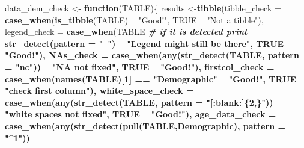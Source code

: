 \documentclass[
]{article}
\newenvironment{Shaded}{\begin{snugshade}}{\end{snugshade}}
\newcommand{\CommentTok}[1]{\textcolor[rgb]{0.56,0.35,0.01}{\textit{#1}}}
\newcommand{\ControlFlowTok}[1]{\textcolor[rgb]{0.13,0.29,0.53}{\textbf{#1}}}
\newcommand{\DataTypeTok}[1]{\textcolor[rgb]{0.13,0.29,0.53}{#1}}
\newcommand{\DecValTok}[1]{\textcolor[rgb]{0.00,0.00,0.81}{#1}}
\newcommand{\KeywordTok}[1]{\textcolor[rgb]{0.13,0.29,0.53}{\textbf{#1}}}
\newcommand{\NormalTok}[1]{#1}
\newcommand{\OperatorTok}[1]{\textcolor[rgb]{0.81,0.36,0.00}{\textbf{#1}}}
\newcommand{\OtherTok}[1]{\textcolor[rgb]{0.56,0.35,0.01}{#1}}
\newcommand{\StringTok}[1]{\textcolor[rgb]{0.31,0.60,0.02}{#1}}
\begin{document}
\begin{Shaded}
\begin{Highlighting}[]
\NormalTok{data_dem_check <-}\StringTok{ }\ControlFlowTok{function}\NormalTok{(TABLE)\{}
\NormalTok{results <-}\KeywordTok{tibble}\NormalTok{(}\DataTypeTok{tibble_check =} \KeywordTok{case_when}\NormalTok{(}\KeywordTok{is_tibble}\NormalTok{(TABLE) }\OperatorTok{~}\StringTok{ "Good!"}\NormalTok{,}
                                                 \OtherTok{TRUE} \OperatorTok{~}\StringTok{ "Not a tibble"}\NormalTok{),}
       \DataTypeTok{legend_check =} \KeywordTok{case_when}\NormalTok{(TABLE }\OperatorTok{%>%}\StringTok{ }\KeywordTok{slice}\NormalTok{(}\KeywordTok{n}\NormalTok{()) }\OperatorTok{%>%}\KeywordTok{pull}\NormalTok{(}\StringTok{`}\DataTypeTok{2018}\StringTok{`}\NormalTok{) }\OperatorTok{%>%}
\StringTok{   }\CommentTok{# if it is detected print }
\StringTok{                          }\KeywordTok{str_detect}\NormalTok{(}\DataTypeTok{pattern =} \StringTok{"--"}\NormalTok{)  }\OperatorTok{~}\StringTok{ "Legend might still be there"}\NormalTok{,}
                                                 \OtherTok{TRUE} \OperatorTok{~}\StringTok{ "Good!"}\NormalTok{),}
       \DataTypeTok{NAs_check =} \KeywordTok{case_when}\NormalTok{(}\KeywordTok{any}\NormalTok{(}\KeywordTok{str_detect}\NormalTok{(TABLE, }\DataTypeTok{pattern =} \StringTok{"nc"}\NormalTok{)) }
                                                      \OperatorTok{~}\StringTok{ "NA not fixed"}\NormalTok{,}
                                                 \OtherTok{TRUE} \OperatorTok{~}\StringTok{ "Good!"}\NormalTok{),}
  \DataTypeTok{firstcol_check =} \KeywordTok{case_when}\NormalTok{(}\KeywordTok{names}\NormalTok{(TABLE)[}\DecValTok{1}\NormalTok{] }\OperatorTok{==}\StringTok{ "Demographic"} 
                                                      \OperatorTok{~}\StringTok{ "Good!"}\NormalTok{,}
                                                 \OtherTok{TRUE} \OperatorTok{~}\StringTok{ "check first column"}\NormalTok{),}
  \DataTypeTok{white_space_check =} \KeywordTok{case_when}\NormalTok{(}\KeywordTok{any}\NormalTok{(}\KeywordTok{str_detect}\NormalTok{(TABLE, }\DataTypeTok{pattern =} \StringTok{"[:blank:]\{2,\}"}\NormalTok{)) }
                                                      \OperatorTok{~}\StringTok{ "white spaces not fixed"}\NormalTok{,}
                                                 \OtherTok{TRUE} \OperatorTok{~}\StringTok{ "Good!"}\NormalTok{),}
  \DataTypeTok{age_data_check =} \KeywordTok{case_when}\NormalTok{(}\KeywordTok{any}\NormalTok{(}\KeywordTok{str_detect}\NormalTok{(}\KeywordTok{pull}\NormalTok{(TABLE,Demographic), }\DataTypeTok{pattern =} \StringTok{"^1"}\NormalTok{))}
}
\end{Highlighting}
\end{Shaded}
\end{document}
